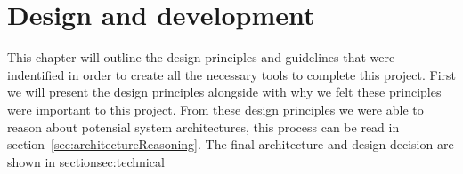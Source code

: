 \chapter{Design and development}
	This chapter will outline the design principles and guidelines that were indentified in order to create all the necessary tools to complete this project. 
	First we will present the design principles alongside with why we felt these principles were important to this project.
	From these design principles we were able to reason about potensial system architectures, this process can be read in section~\ref{sec:architectureReasoning}.
	The final architecture and design decision are shown in section{sec:technical}
	



%
